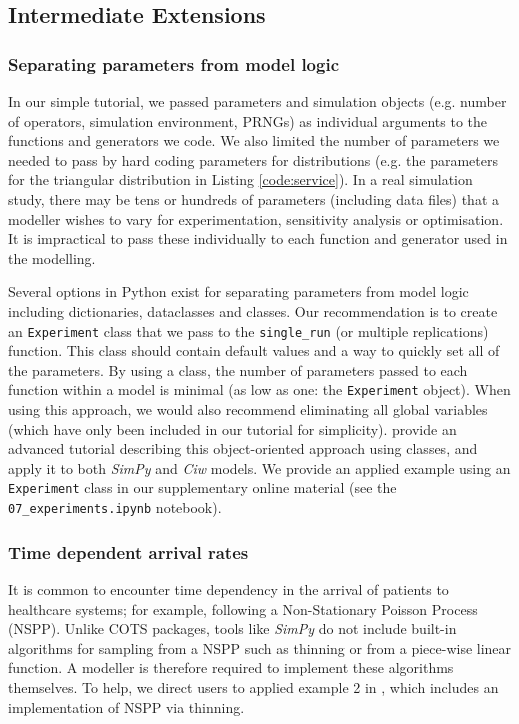 \documentclass{swpaperproc}
\theoremstyle{sw}
\begin{document}
\subsection{Intermediate Extensions}

\subsubsection{Separating parameters from model logic}

In our simple tutorial, we passed parameters and simulation objects (e.g. number of operators, simulation environment, PRNGs) as individual arguments to the functions and generators we code. We also limited the number of parameters we needed to pass by hard coding parameters for distributions (e.g. the parameters for the triangular distribution in Listing \ref{code:service}). In a real simulation study, there may be tens or hundreds of parameters (including data files) that a modeller wishes to vary for experimentation, sensitivity analysis or optimisation. It is impractical to pass these individually to each function and generator used in the modelling. 

Several options in Python exist for separating parameters from model logic including dictionaries, dataclasses and classes.  Our recommendation is to create an \verb|Experiment| class that we pass to the \verb|single_run| (or multiple replications) function. This class should contain default values and a way to quickly set all of the parameters. By using a class, the number of parameters passed to each function within a model is minimal (as low as one: the \verb|Experiment| object). When using this approach, we would also recommend eliminating all global variables (which have only been included in our tutorial for simplicity).  provide an advanced tutorial describing this object-oriented approach using classes, and apply it to both \textit{SimPy} and \textit{Ciw} models.  We provide an applied example using an \verb|Experiment| class in our supplementary online material (see the \verb|07_experiments.ipynb| notebook).


\subsubsection{Time dependent arrival rates}

It is common to encounter time dependency in the arrival of patients to healthcare systems; for example, following a Non-Stationary Poisson Process (NSPP).  Unlike COTS packages, tools like \textit{SimPy} do not include built-in algorithms for sampling from a NSPP such as thinning or from a piece-wise linear function.  A modeller is therefore required to implement these algorithms themselves. To help, we direct users to applied example 2 in , which includes an implementation of NSPP via thinning.
\end{document}

